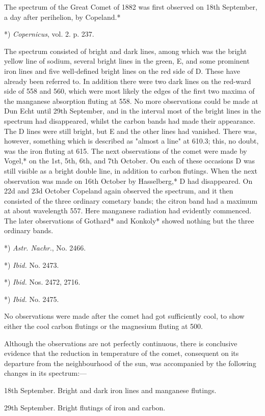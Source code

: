 \documentclass[a4paper, 12pt, oneside, polutonikogreek, english]{article}
\begin{document}
The spectrum of the Great Comet of 1882 was first observed on 18th September, a day after perihelion, by Copeland.*

*) \emph{Copernicus}, vol. 2. p. 237.

The spectrum consisted of bright and dark lines, among which was the bright yellow line of sodium, several bright lines in the green, E, and some prominent iron lines and five well-defined bright lines on the red side of D. These have already been referred to. In addition there were two dark lines on the red-ward side of 558 and 560, which were most likely the edges of the first two maxima of the manganese absorption fluting at 558. No more observations could be made at Dun Echt until 29th September, and in the interval most of the bright lines in the spectrum had disappeared, whilst the carbon bands had made their appearance. The D lines were still bright, but E and the other lines had vanished. There was, however, something which is described as "almost a line" at 610.3; this, no doubt, was the iron fluting at 615. The next observations of the comet were made by Vogel,* on the 1st, 5th, 6th, and 7th October. On each of these occasions D was still visible as a bright double line, in addition to carbon flutings. When the next observation was made on 16th October by Hasselberg,* D had disappeared. On 22d and 23d October Copeland again observed the spectrum, and it then consisted of the three ordinary cometary bands; the citron band had a maximum at about wavelength 557. Here manganese radiation had evidently commenced. The later observations of Gothard* and Konkoly* showed nothing but the three ordinary bands.

*) \emph{Astr. Nachr.}, No. 2466.

*) \emph{Ibid.} No. 2473.

*) \emph{Ibid.} Nos. 2472, 2716.

*) \emph{Ibid.} No. 2475.

No observations were made after the comet had got sufficiently cool, to show either the cool carbon flutings or the magnesium fluting at 500.

Although the observations are not perfectly continuous, there is conclusive evidence that the reduction in temperature of the comet, consequent on its departure from the neighbourhood of the sun, was accompanied by the following changes in its spectrum:---

18th September. Bright and dark iron lines and manganese flutings.

29th September. Bright flutings of iron and carbon.
\end{document}
